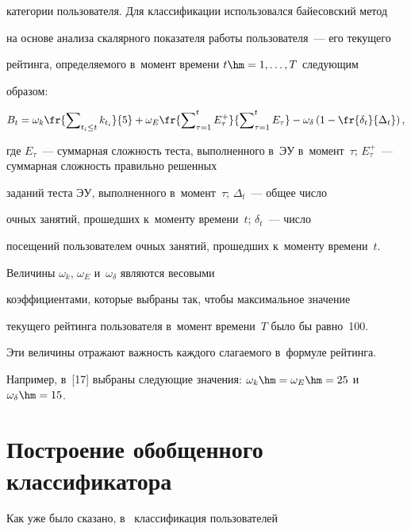категории пользователя. Для классификации использовался байесовский метод 


на основе анализа скалярного показателя работы пользователя~--- его текущего 


рейтинга, определяемого в~момент времени $t\hm= 1, \ldots , T$ следующим 


образом:


     $$


     B_t=\omega_k \fr{\sum\nolimits_{t_i\leq t} k_{t_i}}{5} +\omega_E 


\fr{\sum\nolimits^t_{\tau=1} E_\tau^+}{\sum\nolimits^t_{\tau=1} E_\tau} -


\omega_\delta \left( 1-\fr{\delta_t}{\Delta_t}\right),


     $$


где $E_\tau$~--- суммарная сложность теста, выполненного в~ЭУ в~момент~$\tau$; $E_\tau^+$~--- суммарная сложность правильно решенных 


заданий теста ЭУ, выполненного в~момент~$\tau$; $\Delta_t$~--- общее число 


очных занятий, прошедших к~моменту времени~$t$; $\delta_t$~--- число 


посещений пользователем очных занятий, прошедших к~моменту времени~$t$.


     


     Величины $\omega_k$, $\omega_E$ и~$\omega_\delta$ являются весовыми 


коэффициентами, которые выбраны так, чтобы максимальное значение 


текущего рейтинга пользователя в~момент времени~$T$ было бы равно~100. 


Эти величины отражают важность каждого слагаемого в~формуле рейтинга. 


Например, в~[17] выбраны следующие значения: $\omega_k\hm= \omega_E\hm= 


25$ и~$\omega_\delta\hm= 15$. 





\section{Построение обобщенного классификатора}





     Как уже было сказано, в~\cite{4-nau} классификация пользователей 


